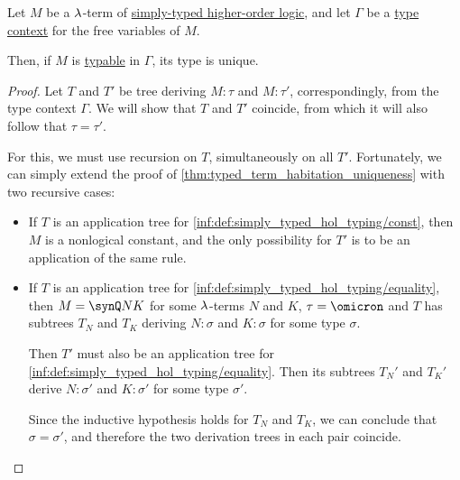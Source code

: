 \begin{proposition}\label{thm:simply_typed_hol_type_uniqueness}
  Let \( M \) be a \( {\mathrm \lambda} \)-term of \hyperref[def:simply_typed_hol]{simply-typed higher-order logic}, and let \( \Gamma \) be a \hyperref[def:type_context]{type context} for the free variables of \( M \).

  Then, if \( M \) is \hyperref[def:typability]{typable} in \( \Gamma \), its type is unique.
\end{proposition}
\begin{proof}
  Let \( T \) and \( T' \) be tree deriving \( M: \tau \) and \( M: \tau' \), correspondingly, from the type context \( \Gamma \). We will show that \( T \) and \( T' \) coincide, from which it will also follow that \( \tau = \tau' \).

  For this, we must use recursion on \( T \), simultaneously on all \( T' \). Fortunately, we can simply extend the proof of \cref{thm:typed_term_habitation_uniqueness} with two recursive cases:
  \begin{itemize}
    \item If \( T \) is an application tree for \ref{inf:def:simply_typed_hol_typing/const}, then \( M \) is a nonlogical constant, and the only possibility for \( T' \) is to be an application of the same rule.

    \item If \( T \) is an application tree for \ref{inf:def:simply_typed_hol_typing/equality}, then \( M = \synQ N K \) for some \( {\mathrm \lambda} \)-terms \( N \) and \( K \), \( \tau = \omicron \) and \( T \) has subtrees \( T_N \) and \( T_K \) deriving \( N: \sigma \) and \( K: \sigma \) for some type \( \sigma \).

    Then \( T' \) must also be an application tree for \ref{inf:def:simply_typed_hol_typing/equality}. Then its subtrees \( T_N' \) and \( T_K' \) derive \( N: \sigma' \) and \( K: \sigma' \) for some type \( \sigma' \).

    Since the inductive hypothesis holds for \( T_N \) and \( T_K \), we can conclude that \( \sigma = \sigma' \), and therefore the two derivation trees in each pair coincide.
  \end{itemize}
\end{proof}

